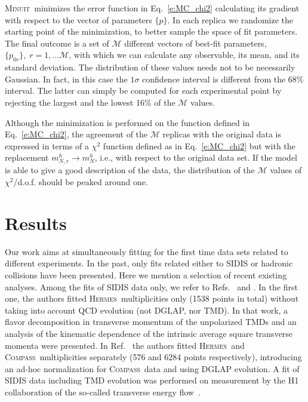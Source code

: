 \documentclass[aps,preprintnumbers,showpacs,nofootinbib,superscriptaddress,floatfix]{revtex4}
\newcommand{\hermes}{\textsc{Hermes}}
\newcommand{\compass}{\textsc{Compass}}
\newcommand{\minuit}{\textsc{Minuit}}
\begin{document}
\minuit\ minimizes the error function in Eq.~\eqref{e:MC_chi2} calculating its gradient with respect to the vector of parameters $\{p\}$. 
In each replica we randomize the starting point of the minimization, to better
sample the space of fit parameters.
 The final outcome is a set of $\mathcal{M}$ different vectors of best-fit parameters, $\{ p_{0r}\},\; r=1,\ldots \mathcal{M}$, with which we can calculate any observable, its mean, and its standard deviation. 
The distribution of these values needs not to be necessarily Gaussian. In fact, in this case the $1 \sigma$ confidence interval is different from the 68\% interval. 
The latter can simply be computed for each experimental point by rejecting the largest and the lowest 16\% of the $\mathcal{M}$ values.   

Although the minimization is performed on the function defined in
Eq.~\eqref{e:MC_chi2}, the agreement of the $\mathcal{M}$ replicas with the
original data is expressed in terms of a $\chi^2$ function defined as in
Eq.~\eqref{e:MC_chi2} but with the replacement $m_{N, r}^{h} \to m_{N}^{h}$,
i.e.,  with respect to the original data set. If the model is able to give a
good description of the data, the distribution of the $\mathcal{M}$ values of
$\chi^2$/d.o.f. should be peaked around one.  














\section{Results}
\label{s:results}


Our work aims at simultaneously fitting for the first time data sets related to different experiments. 
In the past, only fits related either to SIDIS or hadronic collisions have
been presented. Here we mention a selection of recent existing analyses. 
Among the fits of SIDIS data only, we refer to Refs.~\cite{Signori:2013mda}
and
\cite{Anselmino:2013lza}. In the first one, the authors fitted \hermes\ multiplicities only (1538 points in total) without taking into account QCD evolution (not DGLAP, nor TMD). In that work, a flavor decomposition in transverse momentum of the unpolarized TMDs and an analysis of the kinematic dependence of the intrinsic average square transverse momenta were presented. 
In Ref.~\cite{Anselmino:2013lza} the authors fitted \hermes\ and \compass\
multiplicities separately (576 and 6284 points respectively), introducing an
ad-hoc normalization for \compass\ data and using DGLAP evolution. A fit of
SIDIS data including TMD evolution was performed on measurement by the H1
collaboration of the so-called transverse energy flow~\cite{Nadolsky:1999kb,Aid:1995we}. 
 
\end{document}
